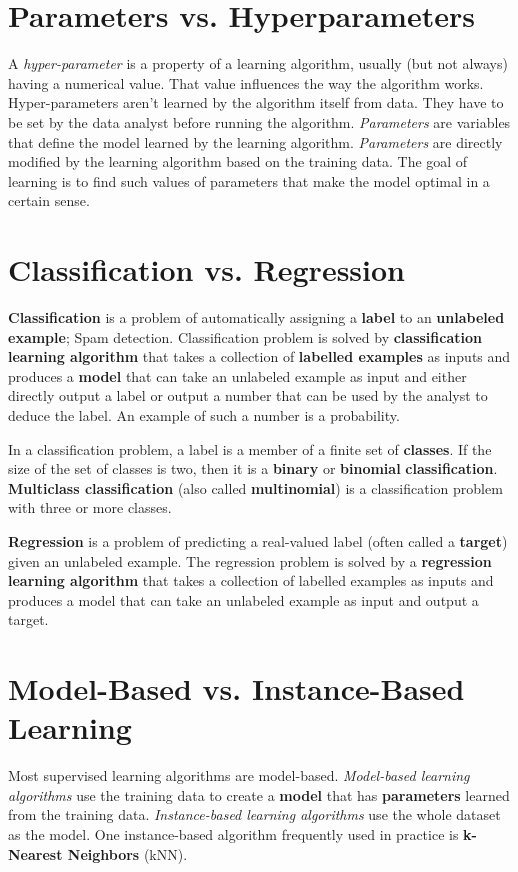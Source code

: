 \section{Parameters vs. Hyperparameters}

A \textit{hyper-parameter} is a property of a learning algorithm, usually (but not always) having a numerical value. That value influences the way the algorithm works. Hyper-parameters aren't learned by the algorithm itself from data. They have to be set by the data analyst before running the algorithm. \textit{Parameters} are variables that define the model learned by the learning algorithm. \textit{Parameters} are directly modified by the learning algorithm based on the training data. The goal of learning is to find such values of parameters that make the model optimal in a certain sense.

\section{Classification vs. Regression}
\textbf{Classification} is a problem of automatically assigning a \textbf{label} to an \textbf{unlabeled example}; Spam detection. Classification problem is solved by \textbf{classification learning algorithm} that takes a collection of \textbf{labelled examples} as inputs and produces a \textbf{model} that can take an unlabeled example as input and either directly output a label or output a number that can be used by the analyst to deduce the label. An example of such a number is a probability.

In a classification problem, a label is a member of a finite set of \textbf{classes}. If the size of the set of classes is two, then it is a \textbf{binary} or \textbf{binomial} \textbf{classification}. \textbf{Multiclass classification} (also called \textbf{multinomial}) is a classification problem with three or more classes.

\textbf{Regression} is a problem of predicting a real-valued label (often called a \textbf{target}) given an unlabeled example. The regression problem is solved by a \textbf{regression learning algorithm} that takes a collection of labelled examples as inputs and produces a model that can take an unlabeled example as input and output a target.

\section{Model-Based vs. Instance-Based Learning}
Most supervised learning algorithms are model-based. \textit{Model-based learning algorithms} use the training data to create a \textbf{model} that has \textbf{parameters} learned from the training data. \textit{Instance-based learning algorithms} use the whole dataset as the model. One instance-based algorithm frequently used in practice is \textbf{k-Nearest Neighbors} (kNN).

